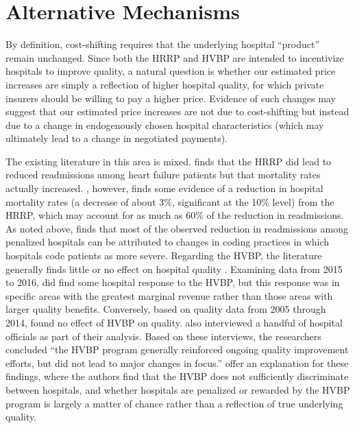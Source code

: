 \documentclass[12pt]{article}
\begin{document}
\section{Alternative Mechanisms}
\label{sec:alt}
By definition, cost-shifting requires that the underlying hospital ``product'' remain unchanged. Since both the HRRP and HVBP are intended to incentivize hospitals to improve quality, a natural question is whether our estimated price increases are simply a reflection of higher hospital quality, for which private insurers should be willing to pay a higher price.  Evidence of such changes may suggest that our estimated price increases are not due to cost-shifting but instead due to a change in endogenously chosen hospital characteristics (which may ultimately lead to a change in negotiated payments).

The existing literature in this area is mixed. \cite{gupta2017} finds that the HRRP did lead to reduced readmissions among heart failure patients but that mortality rates actually increased. \cite{gupta2016}, however, finds some evidence of a reduction in hospital mortality rates (a decrease of about 3\%, significant at the 10\% level) from the HRRP, which may account for as much as 60\% of the reduction in readmissions.  As noted above, \citet{Ibrahim2017} finds that most of the observed reduction in readmissions among penalized hospitals can be attributed to changes in coding practices in which hospitals code patients as more severe.  Regarding the HVBP, the literature generally finds little or no effect on hospital quality \citep{ryan2015,doran2017,norton2017,ryan2017}. Examining data from 2015 to 2016, \cite{norton2017} did find some hospital response to the HVBP, but this response was in specific areas with the greatest marginal revenue rather than those areas with larger quality benefits. Conversely, based on quality data from 2005 through 2014, \cite{gao2015} found no effect of HVBP on quality. \cite{gao2015} also interviewed a handful of hospital officials as part of their analysis. Based on these interviews, the researchers concluded ``the HVBP program generally reinforced ongoing quality improvement efforts, but did not lead to major changes in focus.'' \cite{friedson2016} offer an explanation for these findings, where the authors find that the HVBP does not sufficiently discriminate between hospitals, and whether hospitals are penalized or rewarded by the HVBP program is largely a matter of chance rather than a reflection of true underlying quality.
\end{document}
